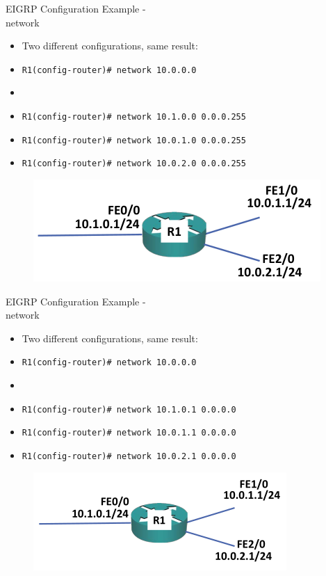 \documentclass[pdflatex,compress,mathserif]{beamer}
\begin{document}
\begin{frame}{EIGRP Configuration Example -\\ network}
	\begin{itemize}
		\item Two different configurations, same result:
		\item \texttt{R1(config-router)\# network 10.0.0.0}
		\item[]
		\item \texttt{R1(config-router)\# network 10.1.0.0 0.0.0.255}
		\item \texttt{R1(config-router)\# network 10.0.1.0 0.0.0.255}
		\item \texttt{R1(config-router)\# network 10.0.2.0 0.0.0.255}
	\end{itemize}
	\begin{figure}
		\centering
		\includegraphics[width=0.6\linewidth]{img/img18}
	\end{figure}
\end{frame}

\begin{frame}{EIGRP Configuration Example -\\ network}
	\begin{itemize}
		\item Two different configurations, same result:
		\item \texttt{R1(config-router)\# network 10.0.0.0}
		\item[]
		\item \texttt{R1(config-router)\# network 10.1.0.1 0.0.0.0}
		\item \texttt{R1(config-router)\# network 10.0.1.1 0.0.0.0}
		\item \texttt{R1(config-router)\# network 10.0.2.1 0.0.0.0}
	\end{itemize}
	\begin{figure}
		\centering
		\includegraphics[width=0.6\linewidth]{img/img19}
	\end{figure}
\end{frame}
\end{document}
